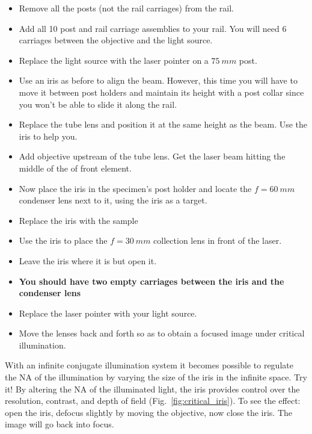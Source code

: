 \documentclass[a4paper]{report}
\begin{document}
\begin{itemize}
\item Remove all the posts (not the rail carriages) from the rail.
\item Add all 10 post and rail carriage assemblies to your rail. You will need 6 carriages between the objective and the light source.
\item Replace the light source with the laser pointer on a $75~mm$ post. 
\item Use an iris as before to align the beam. However, this time you will have to move it between post holders and maintain its height with a post collar since you won't be able to slide it along the rail.
\item Replace the tube lens and position it at the same height as the beam. Use the iris to help you.
\item Add objective upstream of the tube lens. Get the laser beam hitting the middle of the of front element. 
\item Now place the iris in the specimen's post holder and locate the $f=60~mm$ condenser lens next to it, using the iris as a target. 
\item Replace the iris with the sample
\item Use the iris to place the $f=30~mm$ collection lens in front of the laser.
\item Leave the iris where it is but open it. 
\item \textbf{You should have two empty carriages between the iris and the condenser lens}
\item Replace the laser pointer with your light source. 
\item Move the lenses back and forth so as to obtain a focused image under critical illumination. 
\end{itemize}


With an infinite conjugate illumination system it becomes possible to regulate the NA of the illumination by varying the size of the iris in the infinite space. 
Try it!
By altering the NA of the illuminated light, the iris provides control over the resolution, contrast, and depth of field (Fig.~\ref{fig:critical_iris}).
To see the effect: open the iris, defocus slightly by moving the objective, now close the iris. The image will go back into focus. 
\end{document}
